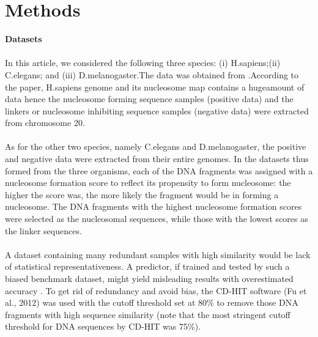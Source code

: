 \documentclass{article}
\begin{document}
\section{Methods}

\textbf{Datasets} \\ \\
In this article, we considered the following three species: 
(i) H.sapiens;(ii) C.elegans; and (iii) D.melanogaster.The data was obtained from 
\citep{Guo1093bioinformaticsbtu083-ss}.According to the paper, H.sapiens genome and its 
nucleosome map contains a hugeamount of data hence the  
nucleosome forming sequence samples (positive data) and the linkers or nucleosome inhibiting sequence samples (negative data) were 
extracted from chromosome 20. \\ \\
As for the other two species, namely C.elegans and D.melanogaster, 
the positive and negative data were extracted from their entire genomes. 
In the datasets thus formed from the three organisms, 
each of the DNA fragments was assigned with a nucleosome formation score to reflect its propensity to form nucleosome: the higher the score was, 
the more likely the fragment would be in forming a nucleosome. 
The DNA fragments with the highest nucleosome formation scores were selected as the nucleosomal sequences, while those with the lowest scores 
as the linker sequences. \\ \\
A dataset containing many redundant samples with high similarity would be lack of 
statistical representativeness. A predictor, if trained and tested by such a biased benchmark dataset, might yield misleading results with overestimated 
accuracy \citep{Chou1038nprot2007-xf}. To get rid of redundancy and avoid bias,
the CD-HIT software (Fu et al., 2012) was used with the cutoff threshold set at 80\% 
to remove those DNA fragments with high sequence similarity (note that the 
most stringent cutoff threshold for DNA sequences by CD-HIT was 75\%).
\end{document}
